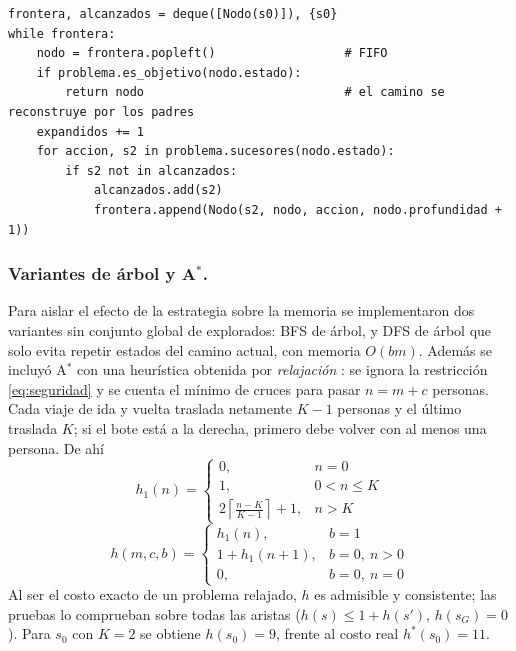\documentclass[runningheads]{llncs}
\begin{document}
\begin{lstlisting}[caption={Núcleo de BFS; DFS cambia \texttt{popleft()} por \texttt{pop()}.},label={lst:bfs}]
frontera, alcanzados = deque([Nodo(s0)]), {s0}
while frontera:
    nodo = frontera.popleft()                  # FIFO
    if problema.es_objetivo(nodo.estado):
        return nodo                            # el camino se reconstruye por los padres
    expandidos += 1
    for accion, s2 in problema.sucesores(nodo.estado):
        if s2 not in alcanzados:
            alcanzados.add(s2)
            frontera.append(Nodo(s2, nodo, accion, nodo.profundidad + 1))
\end{lstlisting}

\subsubsection{Variantes de árbol y A$^*$.}
Para aislar el efecto de la estrategia sobre la memoria se implementaron dos
variantes sin conjunto global de explorados: BFS de árbol, y DFS de árbol que solo
evita repetir estados del camino actual, con memoria $O(bm)$. Además se incluyó
A$^*$ \cite{hart1968} con una heurística obtenida por \emph{relajación}
\cite{pearl1984}: se ignora la restricción \eqref{eq:seguridad} y se cuenta el
mínimo de cruces para pasar $n=m+c$ personas. Cada viaje de ida y vuelta traslada
netamente $K-1$ personas y el último traslada $K$; si el bote está a la derecha, primero debe volver con al menos una persona. De ahí
\begin{equation}
  h_1(n) = \begin{cases} 0, & n=0\\ 1, & 0<n\le K\\ 2\left\lceil \frac{n-K}{K-1}\right\rceil+1, & n>K \end{cases}
\end{equation}
\begin{equation}
  h(m,c,b) = \begin{cases} h_1(n), & b=1\\ 1 + h_1(n+1), & b=0,\ n>0\\ 0, & b=0,\ n=0 \end{cases}
\end{equation}
Al ser el costo exacto de un problema relajado, $h$ es admisible y consistente;
las pruebas lo comprueban sobre todas las aristas ($h(s)\le 1+h(s')$, $h(s_G)=0$).
Para $s_0$ con $K=2$ se obtiene $h(s_0)=9$, frente al costo real $h^*(s_0)=11$.

\end{document}
